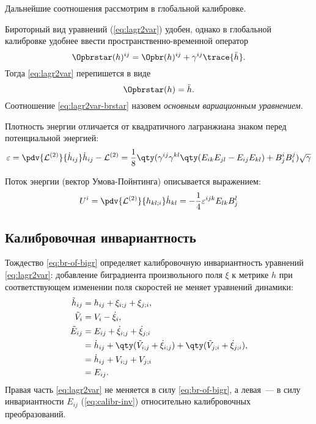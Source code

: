 \documentclass[\docroot/reports/draft/report.tex]{subfiles}
\begin{document}
    Дальнейшие соотношения рассмотрим в глобальной калибровке.

    Бироторный вид уравнений (\autoref{eq:lagr2var}) удобен, однако в глобальной калибровке удобнее ввести пространственно-временной оператор
    \begin{equation}\label{eq:brtr}
        \Opbrstar(h)^{ij} = \Opbr(h)^{ij} + \gamma^{ij} \trace{\ddot{h}} .
    \end{equation}
    Тогда \autoref{eq:lagr2var} перепишется в виде
    \begin{equation}\label{eq:lagr2var-brstar}
        \Opbrstar(h) = \ddot{h} .
    \end{equation}
    Соотношение \ref{eq:lagr2var-brstar} назовем \textit{основным вариационным уравнением}.

    Плотность энергии отличается от квадратичного лагранжиана знаком перед потенциальной энергией:
    \begin{equation}\label{eq:eps}
        \varepsilon = \pdv{\mathcal{L}^{(2)}}{\dot{h}_{ij}} \dot{h}_{ij} - \mathcal{L}^{(2)}
                    = \frac{1}{8} \qty(
            \gamma^{ij} \gamma^{kl} \qty(
                E_{ik} E_{jl} - E_{ij} E_{kl}
            ) + B^i_j B^j_i
        ) \sqrt{\gamma}
    \end{equation}

    Поток энергии (вектор Умова-Пойнтинга) описывается выражением:
    \begin{equation}\label{eq:Uil}
        U^i = \pdv{\mathcal{L}^{(2)}}{h_{kl;i}} \dot{h}_{kl}
            = -\frac{1}{4}\varepsilon^{ijk} E_{lk} B^l_j
    \end{equation}

\subsection{Калибровочная инвариантность}

    Тождество \ref{eq:br-of-bigr} определяет калибровочную инвариантность уравнений \ref{eq:lagr2var}: добавление биградиента произвольного поля $\xi$ к метрике $h$ при соответствующем изменении поля скоростей не меняет уравнений динамики:
    \begin{equation}\begin{aligned}\label{eq:calibr-inv}
        \tilde{h}_{ij} &= h_{ij} + \xi_{i;j} + \xi_{j;i}, \\
        \tilde{V}_i    &= V_i - \dot{\xi}_i, \\
        \tilde{E}_{ij} &= E_{ij} + \dot{\xi}_{i;j} + \dot{\xi}_{j;i} \\
                       &= \dot{h}_{ij} + \qty(\tilde{V}_{i;j} + \dot{\xi}_{i;j}) + \qty(\tilde{V}_{j;i} +  \dot{\xi}_{j;i}), \\
                       &= \dot{h}_{ij} + V_{i;j} + V_{j;i} \\
                       &= E_{ij} .
    \end{aligned}\end{equation}
    Правая часть \autoref{eq:lagr2var} не меняется в силу \autoref{eq:br-of-bigr}, а левая~--- в силу инвариантности $E_{ij}$ (\autoref{eq:calibr-inv}) относительно калибровочных преобразований.
\end{document}
